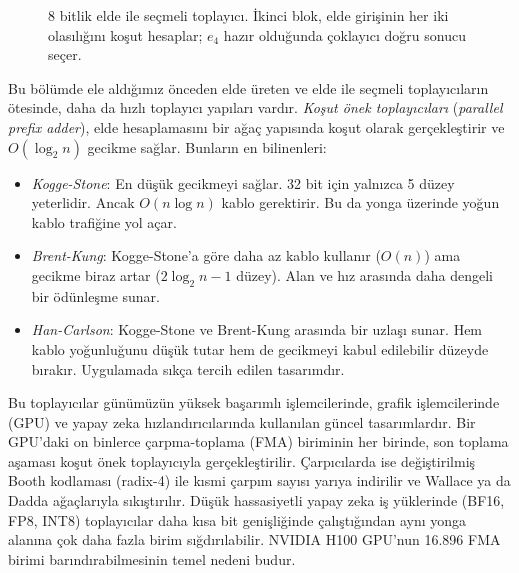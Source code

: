 \begin{figure}[htbp]
\caption[8 bitlik elde ile seçmeli toplayıcı]{8 bitlik elde ile seçmeli toplayıcı. İkinci blok, elde girişinin her iki olasılığını koşut hesaplar; $e_4$ hazır olduğunda çoklayıcı doğru sonucu seçer.}
\label{fig:carry-select-8bit}
\end{figure}

\begin{bilginot}
Bu bölümde ele aldığımız önceden elde üreten ve elde ile seçmeli toplayıcıların ötesinde, daha da hızlı toplayıcı yapıları vardır. \emph{Koşut önek toplayıcıları} (\emph{parallel prefix adder}), elde hesaplamasını bir ağaç yapısında koşut olarak gerçekleştirir ve $O(\log_2 n)$ gecikme sağlar. Bunların en bilinenleri:
\begin{itemize}
  \item \emph{Kogge-Stone}: En düşük gecikmeyi sağlar. 32 bit için yalnızca 5 düzey yeterlidir. Ancak $O(n \log n)$ kablo gerektirir. Bu da yonga üzerinde yoğun kablo trafiğine yol açar.
  \item \emph{Brent-Kung}: Kogge-Stone'a göre daha az kablo kullanır ($O(n)$) ama gecikme biraz artar ($2\log_2 n - 1$ düzey). Alan ve hız arasında daha dengeli bir ödünleşme sunar.
  \item \emph{Han-Carlson}: Kogge-Stone ve Brent-Kung arasında bir uzlaşı sunar. Hem kablo yoğunluğunu düşük tutar hem de gecikmeyi kabul edilebilir düzeyde bırakır. Uygulamada sıkça tercih edilen tasarımdır.
\end{itemize}
Bu toplayıcılar günümüzün yüksek başarımlı işlemcilerinde, grafik işlemcilerinde (GPU) ve yapay zeka hızlandırıcılarında kullanılan güncel tasarımlardır. Bir GPU'daki on binlerce çarpma-toplama (FMA) biriminin her birinde, son toplama aşaması koşut önek toplayıcıyla gerçekleştirilir. Çarpıcılarda ise değiştirilmiş Booth kodlaması (radix-4) ile kısmi çarpım sayısı yarıya indirilir ve Wallace ya da Dadda ağaçlarıyla sıkıştırılır. Düşük hassasiyetli yapay zeka iş yüklerinde (BF16, FP8, INT8) toplayıcılar daha kısa bit genişliğinde çalıştığından aynı yonga alanına çok daha fazla birim sığdırılabilir. NVIDIA H100 GPU'nun 16.896 FMA birimi barındırabilmesinin temel nedeni budur.
\end{bilginot}


